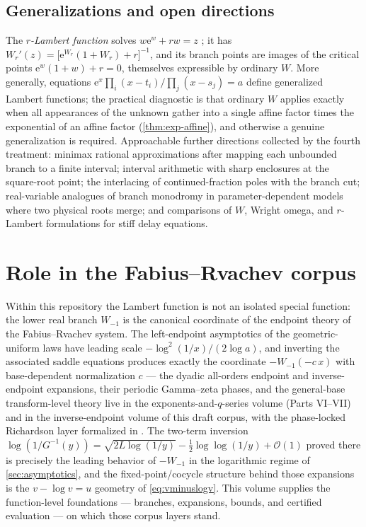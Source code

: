 \documentclass[11pt]{article}
\theoremstyle{remark}
\newcommand{\ee}{\mathrm e}
\newcommand{\bigO}{\mathcal O}
\begin{document}
\subsection{Generalizations and open directions}

The \emph{\(r\)-Lambert function} solves \(w\ee^w+rw=z\)
\cite{mezobaricz2017}; it has
\(W_r'(z)=\bigl[\ee^{W_r}(1+W_r)+r\bigr]^{-1}\), and its branch points are
images of the critical points \(\ee^w(1+w)+r=0\), themselves expressible by
ordinary \(W\).  More generally, equations
\(\ee^x\prod_i(x-t_i)/\prod_j(x-s_j)=a\) define generalized Lambert
functions; the practical diagnostic is that ordinary \(W\) applies exactly
when all appearances of the unknown gather into a single affine factor times
the exponential of an affine factor (\cref{thm:exp-affine}), and otherwise a
genuine generalization is required.  Approachable further directions
collected by the fourth treatment: minimax rational approximations after
mapping each unbounded branch to a finite interval; interval arithmetic with
sharp enclosures at the square-root point; the interlacing of
continued-fraction poles with the branch cut; real-variable analogues of
branch monodromy in parameter-dependent models where two physical roots
merge; and comparisons of \(W\), Wright omega, and \(r\)-Lambert
formulations for stiff delay equations.

\section{Role in the Fabius--Rvachev corpus}\label{sec:corpus-role}

Within this repository the Lambert function is not an isolated special
function: the lower real branch \(W_{-1}\) is the canonical coordinate of
the endpoint theory of the Fabius--Rvachev system.  The left-endpoint
asymptotics of the geometric-uniform laws have leading scale
\(-\log^2(1/x)/(2\log a)\), and inverting the associated saddle equations
produces exactly the coordinate \(-W_{-1}(-c\,x)\) with base-dependent
normalization \(c\) --- the dyadic all-orders endpoint and inverse-endpoint
expansions, their periodic Gamma--zeta phases, and the general-base
transform-level theory live in the exponents-and-\(q\)-series volume
(Parts VI--VII) and in the inverse-endpoint volume of this draft corpus,
with the phase-locked Richardson layer formalized in
.  The two-term inversion
\(\log(1/G^{-1}(y))=\sqrt{2L\log(1/y)}-\tfrac12\log\log(1/y)+\bigO(1)\)
proved there is precisely the leading behavior of \(-W_{-1}\) in the
logarithmic regime of \cref{sec:asymptotics}, and the fixed-point/cocycle
structure behind those expansions is the \(v-\log v=u\) geometry of
\cref{eq:vminuslogv}.  This volume supplies the function-level foundations
--- branches, expansions, bounds, and certified evaluation --- on which
those corpus layers stand.
\end{document}
